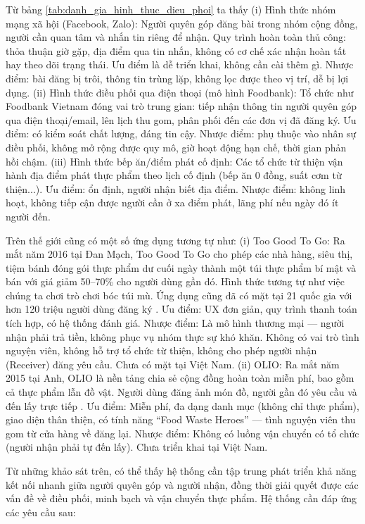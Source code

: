\documentclass[../main.tex]{subfiles}%
\begin{document}
Từ bảng \ref{tab:danh_gia_hinh_thuc_dieu_phoi} ta thấy (i) Hình thức nhóm mạng xã hội (Facebook, Zalo): Người quyên góp đăng bài trong nhóm cộng đồng, người cần quan tâm và nhắn tin riêng để nhận. Quy trình hoàn toàn thủ công: thỏa thuận giờ gặp, địa điểm qua tin nhắn, không có cơ chế xác nhận hoàn tất hay theo dõi trạng thái. Ưu điểm là dễ triển khai, không cần cài thêm gì. Nhược điểm: bài đăng bị trôi, thông tin trùng lặp, không lọc được theo vị trí, dễ bị lợi dụng. (ii) Hình thức điều phối qua điện thoại (mô hình Foodbank): Tổ chức như Foodbank Vietnam đóng vai trò trung gian: tiếp nhận thông tin người quyên góp qua điện thoại/email, lên lịch thu gom, phân phối đến các đơn vị đã đăng ký. Ưu điểm: có kiểm soát chất lượng, đáng tin cậy. Nhược điểm: phụ thuộc vào nhân sự điều phối, không mở rộng được quy mô, giờ hoạt động hạn chế, thời gian phản hồi chậm. (iii) Hình thức bếp ăn/điểm phát cố định: Các tổ chức từ thiện vận hành địa điểm phát thực phẩm theo lịch cố định (bếp ăn 0 đồng, suất cơm từ thiện...). Ưu điểm: ổn định, người nhận biết địa điểm. Nhược điểm: không linh hoạt, không tiếp cận được người cần ở xa điểm phát, lãng phí nếu ngày đó ít người đến.

Trên thế giới cũng có một số ứng dụng tương tự như: (i) Too Good To Go: Ra mắt năm 2016 tại Đan Mạch, Too Good To Go cho phép các nhà hàng, siêu thị, tiệm bánh đóng gói thực phẩm dư cuối ngày thành một túi thực phẩm bí mật và bán với giá giảm 50–70\% cho người dùng gần đó. Hình thức tương tự như việc chúng ta chơi trò chơi bóc túi mù. Ứng dụng cũng đã có mặt tại 21 quốc gia với hơn 120 triệu người dùng đăng ký \cite{TooGoodToGo}. Ưu điểm: UX đơn giản, quy trình thanh toán tích hợp, có hệ thống đánh giá. Nhược điểm: Là mô hình thương mại — người nhận phải trả tiền, không phục vụ nhóm thực sự khó khăn. Không có vai trò tình nguyện viên, không hỗ trợ tổ chức từ thiện, không cho phép người nhận (Receiver) đăng yêu cầu. Chưa có mặt tại Việt Nam.
(ii) OLIO: Ra mắt năm 2015 tại Anh, OLIO là nền tảng chia sẻ cộng đồng hoàn toàn miễn phí, bao gồm cả thực phẩm lẫn đồ vật. Người dùng đăng ảnh món đồ, người gần đó yêu cầu và đến lấy trực tiếp \cite{Olio}. Ưu điểm: Miễn phí, đa dạng danh mục (không chỉ thực phẩm), giao diện thân thiện, có tính năng ``Food Waste Heroes'' — tình nguyện viên thu gom từ cửa hàng về đăng lại. Nhược điểm: Không có luồng vận chuyển có tổ chức (người nhận phải tự đến lấy). Chưa triển khai tại Việt Nam.

Từ những khảo sát trên, có thể thấy hệ thống cần tập trung phát triển khả năng kết nối nhanh giữa người quyên góp và người nhận, đồng thời giải quyết được các vấn đề về điều phối, minh bạch và vận chuyển thực phẩm. Hệ thống cần đáp ứng các yêu cầu sau:
\end{document}
